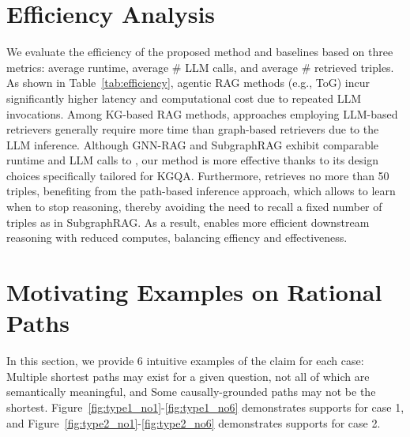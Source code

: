\section{Efficiency Analysis}
We evaluate the efficiency of the proposed method and baselines based on three metrics: average runtime, average $\#$ LLM calls, and average $\#$ retrieved triples. As shown in Table~\ref{tab:efficiency}, agentic RAG methods (e.g., ToG) incur significantly higher latency and computational cost due to repeated LLM invocations. Among KG-based RAG methods, approaches employing LLM-based retrievers generally require more time than graph-based retrievers due to the LLM inference. Although GNN-RAG and SubgraphRAG exhibit comparable runtime and LLM calls to \proj, our method is more effective thanks to its design choices specifically tailored for KGQA. Furthermore, \proj{} retrieves no more than 50 triples, benefiting from the path-based inference approach, which allows \proj{} to learn when to stop reasoning, thereby avoiding the need to recall a fixed number of triples  as in SubgraphRAG. As a result, \proj{} enables more efficient downstream reasoning with reduced computes, balancing effiency and effectiveness. 
\begin{table}[!t]
\centering
\caption{Efficiency analysis of different methods on WebQSP dataset.}
\label{tab:efficiency}
\end{table}

\section{Motivating Examples on Rational Paths}
\label{app:label-rationale}
 In this section, we provide 6 intuitive examples of the claim for each case:  Multiple shortest paths may exist for a given question, not all of which are semantically meaningful, and  Some causally-grounded paths may not be the shortest. Figure~\ref{fig:type1_no1}-\ref{fig:type1_no6} demonstrates supports for case 1, and Figure~\ref{fig:type2_no1}-\ref{fig:type2_no6} demonstrates supports for case 2. 

